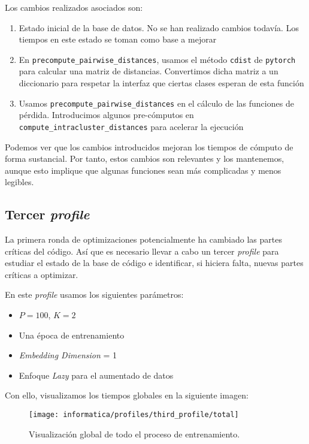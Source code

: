 Los cambios realizados asociados son:

\begin{enumerate}
    \item Estado inicial de la base de datos. No se han realizado cambios todavía. Los tiempos en este estado se toman como base a mejorar
    \item En \lstinline|precompute_pairwise_distances|, usamos el método \lstinline|cdist| de \lstinline|pytorch| para calcular una matriz de distancias. Convertimos dicha matriz a un diccionario para respetar la interfaz que ciertas clases esperan de esta función
    \item Usamos \lstinline|precompute_pairwise_distances| en el cálculo de las funciones de pérdida. Introducimos algunos pre-cómputos en \lstinline|compute_intracluster_distances| para acelerar la ejecución
\end{enumerate}

Podemos ver que los cambios introducidos mejoran los tiempos de cómputo de forma sustancial. Por tanto, estos cambios son relevantes y los mantenemos, aunque esto implique que algunas funciones sean más complicadas y menos legibles.

\subsection{Tercer \textit{profile}}

La primera ronda de optimizaciones potencialmente ha cambiado las partes críticas del código. Así que es necesario llevar a cabo un tercer \textit{profile} para estudiar el estado de la base de código e identificar, si hiciera falta, nuevas partes críticas a optimizar.

En este \textit{profile} usamos los siguientes parámetros:

\begin{itemize}
    \item $P = 100$, $K = 2$
    \item Una época de entrenamiento
    \item \textit{Embedding Dimension} = 1
    \item Enfoque \textit{Lazy} para el aumentado de datos
\end{itemize}

Con ello, visualizamos los tiempos globales en la siguiente imagen:

\begin{figure}[H]
    \centering
    \texttt{[image: informatica/profiles/third\_profile/total]}
    \caption{Visualización global de todo el proceso de entrenamiento.}
\end{figure}

